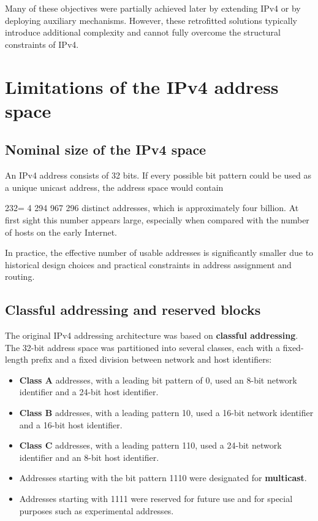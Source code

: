 \documentclass[11pt,a4paper,openany]{report}
\begin{document}
Many of these objectives were partially achieved later by extending IPv4 or by deploying auxiliary mechanisms. However, these retrofitted solutions typically introduce additional complexity and cannot fully overcome the structural constraints of IPv4.

\section{Limitations of the IPv4 address space}

\subsection{Nominal size of the IPv4 space}

An IPv4 address consists of 32 bits. If every possible bit pattern could be used as a unique unicast address, the address space would contain

232= 4 294 967 296 distinct addresses, which is approximately four billion. At first sight this number appears large, especially when compared with the number of hosts on the early Internet.

In practice, the effective number of usable addresses is significantly smaller due to historical design choices and practical constraints in address assignment and routing.

\subsection{Classful addressing and reserved blocks}

The original IPv4 addressing architecture was based on \textbf{classful addressing}. The 32-bit address space was partitioned into several classes, each with a fixed-length prefix and a fixed division between network and host identifiers:

\begin{itemize}
\item \textbf{Class A} addresses, with a leading bit pattern of 0, used an 8-bit network identifier and a 24-bit host identifier.
\item \textbf{Class B} addresses, with a leading pattern 10, used a 16-bit network identifier and a 16-bit host identifier.
\item \textbf{Class C} addresses, with a leading pattern 110, used a 24-bit network identifier and an 8-bit host identifier.
\item Addresses starting with the bit pattern 1110 were designated for \textbf{multicast}.
\item Addresses starting with 1111 were reserved for future use and for special purposes such as experimental addresses.
\end{itemize}
\end{document}
